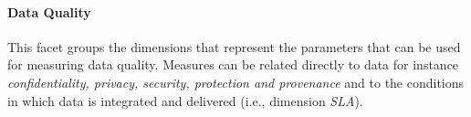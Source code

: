 \paragraph{Data Quality} 
This facet groups the dimensions that represent the parameters that can be used for measuring data quality. Measures can be related directly to data for instance {\em confidentiality, privacy, security, protection and provenance} and to the conditions in which data is integrated and delivered  (i.e., dimension {\em SLA}).

